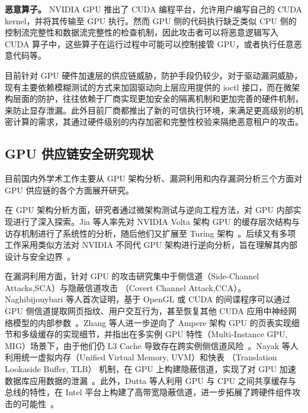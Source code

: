 \textbf{恶意算子。}
NVIDIA GPU 推出了 CUDA 编程平台，允许用户编写自己的 CUDA kernel，并将其传输至 GPU 执行。然而 GPU 侧的代码执行缺乏类似 CPU 侧的控制流完整性和数据流完整性的检查机制，因此攻击者可以将恶意逻辑写入 CUDA 算子中，这些算子在运行过程中可能可以控制接管 GPU，或者执行任意恶意代码等。

目前针对 GPU 硬件加速层的供应链威胁，防护手段仍较少。对于驱动漏洞威胁，现有主要依赖模糊测试的方式来加固驱动向上层应用提供的 ioctl 接口，而在微架构层面的防护，往往依赖于厂商实现更加安全的隔离机制和更加完善的硬件机制，来防止显存泄漏。此外目前厂商都推出了新的可信执行环境，来满足更高级别的机密计算的需求，其通过硬件级别的内存加密和完整性校验来隔绝恶意租户的攻击。

\subsection{GPU 供应链安全研究现状}
目前国内外学术工作主要从 GPU 架构分析、漏洞利用和内存漏洞分析三个方面对 GPU 供应链的各个方面展开研究。

在 GPU 架构分析方面，研究者通过微架构测试与逆向工程方法，对 GPU 内部实现进行了深入探索。Jia 等人率先对 NVIDIA Volta 架构 GPU 的缓存层次结构与访存机制进行了系统性的分析，随后他们又扩展至 Turing 架构~\cite{jia2018dissecting,jia2019dissecting}。后续又有多项工作采用类似方法对 NVIDIA 不同代 GPU 架构进行逆向分析，旨在理解其内部设计与安全边界~\cite{abdelkhalik2022demystifying, jarmusch2025dissecting, luo2025dissecting}。

在漏洞利用方面，针对 GPU 的攻击研究集中于侧信道（Side-Channel Attacks,SCA）与隐蔽信道攻击 （Covert Channel Attack,CCA）。Naghibijouybari 等人首次证明，基于 OpenGL 或 CUDA 的间谍程序可以通过 GPU 侧信道提取网页指纹、用户交互行为，甚至恢复其他 CUDA 应用中神经网络模型的内部参数~\cite{naghibijouybari2018rendered}。Zhang 等人进一步逆向了 Ampere 架构 GPU 的页表实现细节和多级缓存的实现细节，并指出在多实例 GPU 特性（Multi-Instance GPU, MIG）场景下，由于他们仍 L3 Cache 导致存在跨实例侧信道风险~\cite{zhang2023t}。Nayak 等人利用统一虚拟内存（Unified Virtual Memory, UVM）和快表 （Translation Lookaside Buffer, TLB） 机制，在 GPU 上构建隐蔽信道，实现了对 GPU 加速数据库应用数据的泄漏~\cite{nayak2021mis}。此外，Dutta 等人利用 GPU 与 CPU 之间共享缓存与总线的特性，在 Intel 平台上构建了高带宽隐蔽信道，进一步拓展了跨硬件组件攻击的可能性~\cite{dutta2021leakybuddies}。


